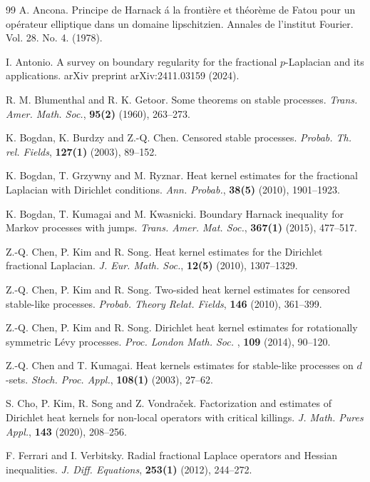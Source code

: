 \documentclass[12pt,a4paper]{amsart}
\numberwithin{equation}{section}
\theoremstyle{plain}
\newcommand{\1}{\mathbbm{1}}
\begin{document}
\begin{thebibliography}{99}
 A. Ancona. Principe de Harnack \'a la fronti\`ere et th\'eor\`eme de Fatou pour un op\'erateur elliptique dans un domaine lipschitzien. Annales de l'institut Fourier. Vol. 28. No. 4. (1978).

 I. Antonio. A survey on boundary regularity for the fractional $p$-Laplacian and its applications. arXiv preprint arXiv:2411.03159 (2024).

 R. M. Blumenthal and R. K. Getoor.
Some theorems on stable processes. \emph{Trans. Amer. Math. Soc.}, \textbf{95(2)} (1960), 263--273.

 K. Bogdan, K. Burdzy and Z.-Q. Chen.
Censored stable processes. 
\emph{Probab. Th. rel. Fields}, \textbf{127(1)} (2003), 89--152.

 K. Bogdan, T. Grzywny and M. Ryznar.
Heat kernel estimates for the fractional Laplacian with Dirichlet conditions.
\emph{Ann. Probab.}, \textbf{38(5)} (2010), 1901--1923.

 K. Bogdan, T. Kumagai and M. Kwasnicki.
Boundary Harnack inequality for Markov processes with jumps.
\emph{Trans. Amer. Mat. Soc.}, \textbf{367(1)} (2015), 477--517.

 Z.-Q. Chen, P. Kim and R. Song.
Heat kernel estimates for the Dirichlet fractional Laplacian.
\emph{J. Eur. Math. Soc.}, \textbf{12(5)} (2010), 1307--1329. 


 Z.-Q. Chen, P. Kim and R. Song.
Two-sided heat kernel estimates for censored stable-like processes. 
\emph{Probab. Theory Relat. Fields}, \textbf{146} (2010), 361--399.

 Z.-Q. Chen, P. Kim and R. Song.
Dirichlet heat kernel estimates for rotationally symmetric L\'evy processes. 
\emph{Proc.  London Math. Soc. }, \textbf{109} (2014), 90--120.

Z.-Q. Chen and T. Kumagai.
Heat kernels estimates for stable-like processes on $d$-sets.
\emph{Stoch. Proc. Appl.}, \textbf{108(1)} (2003), 27--62.

 S. Cho, P. Kim, R. Song and Z. Vondra\v{c}ek.
Factorization and estimates of Dirichlet heat kernels for non-local operators with critical killings. 
\emph{J. Math. Pures Appl.}, \textbf{143} (2020), 208--256.

 F. Ferrari and I. Verbitsky.
Radial fractional Laplace operators and Hessian inequalities.
\emph{J. Diff. Equations}, \textbf{253(1)} (2012), 244--272.


\end{thebibliography}
\end{document}

